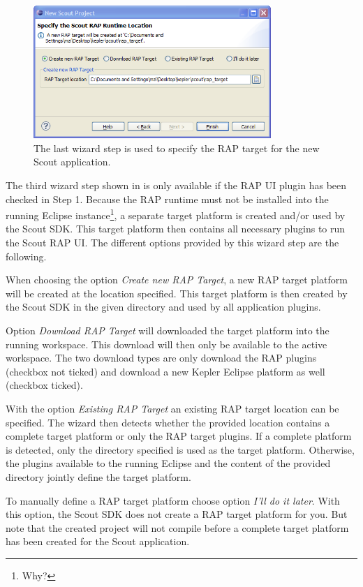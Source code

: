 \documentclass[a4paper,10pt,twoside]{book}
\begin{document}
\begin{figure}
\includegraphics[width=9cm]{wizard_new_project_3.png}
\caption{The last wizard step is used to specify the RAP target for the new Scout application.}
\end{figure}

The third wizard step shown in  is only available if the RAP UI plugin has been checked in Step 1.
Because the RAP runtime must not be installed into the running Eclipse instance\footnote{
Why?
}, 
a separate target platform is created and/or used by the Scout SDK. 
This target platform then contains all necessary plugins to run the Scout RAP UI. 
The different options provided by this wizard step are the following.

When choosing the option \textit{Create new RAP Target}, a new RAP target platform will be created at the location specified. 
This target platform is then created by the Scout SDK in the given directory and used by all application plugins.

Option \textit{Download RAP Target} will downloaded the target platform into the running workspace. 
This download will then only be available to the active workspace.
The two download types are only download the RAP plugins (checkbox not ticked) and download a new Kepler Eclipse platform as well (checkbox ticked). 
    
With the option \textit{Existing RAP Target} an existing RAP target location can be specified. 
The wizard then detects whether the provided location contains a complete target platform or only the RAP target plugins. 
If a complete platform is detected, only the directory specified is used as the target platform. 
Otherwise, the plugins available to the running Eclipse and the content of the provided directory jointly define the target platform.

To manually define a RAP target platform choose option \textit{I'll do it later}. 
With this option, the Scout SDK does not create a RAP target platform for you. 
But note that the created project will not compile before a complete target platform has been created for the Scout application.  
\end{document}
